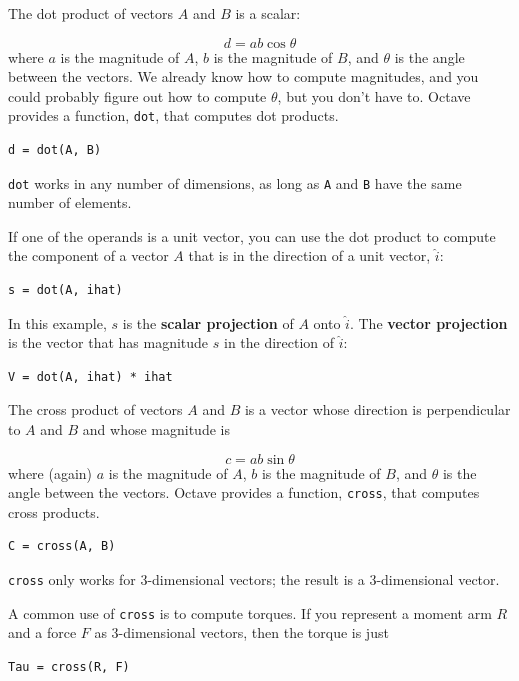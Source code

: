 \documentclass{book}
\begin{document}
The dot product of vectors $A$ and $B$ is a scalar:

\[ d = a b \cos \theta \]
%
where $a$ is the magnitude of $A$, $b$ is the magnitude of $B$,
and $\theta$ is the angle between the vectors. We already know
how to compute magnitudes, and you could probably figure out
how to compute $\theta$, but you don't have to. Octave provides
a function, {\tt dot}, that computes dot products.

\begin{verbatim}
d = dot(A, B)
\end{verbatim}

{\tt dot} works in any number of dimensions, as long as {\tt A}
and {\tt B} have the same number of elements.

If one of the operands is a unit vector, you can use the dot
product to compute the component of a vector $A$ that is in
the direction of a unit vector, $\hat{i}$:

\begin{verbatim}
s = dot(A, ihat)
\end{verbatim}

In this example, $s$ is the {\bf scalar projection} of $A$
onto $\hat{i}$. The {\bf vector projection} is the vector
that has magnitude $s$ in the direction of $\hat{i}$:

\begin{verbatim}
V = dot(A, ihat) * ihat
\end{verbatim}

The cross product of vectors $A$ and $B$ is a vector whose direction
is perpendicular to $A$ and $B$ and whose magnitude is

\[ c = a b \sin \theta \]
%
where (again) $a$ is the magnitude of $A$, $b$ is the magnitude of
$B$, and $\theta$ is the angle between the vectors. Octave provides
a function, {\tt cross}, that computes cross products.

\begin{verbatim}
C = cross(A, B)
\end{verbatim}

{\tt cross} only works for 3-dimensional vectors; the result is
a 3-dimensional vector.

A common use of {\tt cross} is to compute torques. If you represent
a moment arm $R$ and a force $F$ as 3-dimensional vectors, then
the torque is just

\begin{verbatim}
Tau = cross(R, F)
\end{verbatim}
\end{document}
